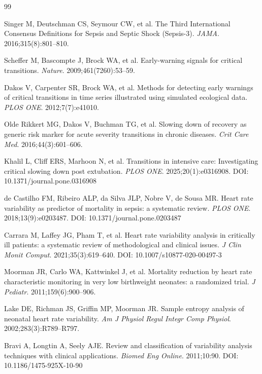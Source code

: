 \documentclass[12pt,a4paper]{article}
\begin{document}

\begin{thebibliography}{99}

Singer M, Deutschman CS, Seymour CW, et al.
The Third International Consensus Definitions for Sepsis and Septic Shock
(Sepsis-3).
\textit{JAMA}. 2016;315(8):801--810.

Scheffer M, Bascompte J, Brock WA, et al.
Early-warning signals for critical transitions.
\textit{Nature}. 2009;461(7260):53--59.

Dakos V, Carpenter SR, Brock WA, et al.
Methods for detecting early warnings of critical transitions in time series
illustrated using simulated ecological data.
\textit{PLOS ONE}. 2012;7(7):e41010.

Olde Rikkert MG, Dakos V, Buchman TG, et al.
Slowing down of recovery as generic risk marker for acute severity transitions
in chronic diseases.
\textit{Crit Care Med}. 2016;44(3):601--606.

Khalil L, Cliff ERS, Marhoon N, et al.
Transitions in intensive care: Investigating critical slowing down
post extubation.
\textit{PLOS ONE}. 2025;20(1):e0316908.
DOI: 10.1371/journal.pone.0316908

de Castilho FM, Ribeiro ALP, da Silva JLP, Nobre V, de Sousa MR.
Heart rate variability as predictor of mortality in sepsis: a systematic
review.
\textit{PLOS ONE}. 2018;13(9):e0203487.
DOI: 10.1371/journal.pone.0203487

Carrara M, Laffey JG, Pham T, et al.
Heart rate variability analysis in critically ill patients: a systematic
review of methodological and clinical issues.
\textit{J Clin Monit Comput}. 2021;35(3):619--640.
DOI: 10.1007/s10877-020-00497-3

Moorman JR, Carlo WA, Kattwinkel J, et al.
Mortality reduction by heart rate characteristic monitoring in very low
birthweight neonates: a randomized trial.
\textit{J Pediatr}. 2011;159(6):900--906.

Lake DE, Richman JS, Griffin MP, Moorman JR.
Sample entropy analysis of neonatal heart rate variability.
\textit{Am J Physiol Regul Integr Comp Physiol}. 2002;283(3):R789--R797.

Bravi A, Longtin A, Seely AJE.
Review and classification of variability analysis techniques with clinical
applications.
\textit{Biomed Eng Online}. 2011;10:90.
DOI: 10.1186/1475-925X-10-90


\end{thebibliography}
\end{document}
